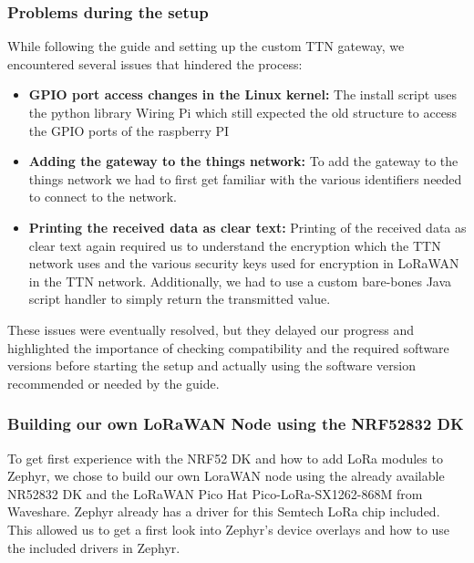 \subsubsection{Problems during the setup}
While following the guide and setting up the custom TTN gateway, we encountered several issues that hindered the process:
\begin{itemize}
    \item \textbf{GPIO port access changes in the Linux kernel:} The install script uses the python library Wiring Pi which still expected the old structure to access the GPIO ports of the raspberry PI
    \item \textbf{Adding the gateway to the things network:} To add the gateway to the things network we had to first get familiar with the various identifiers needed to connect to the network.
    \item \textbf{Printing the received data as clear text:} Printing of the received data as clear text again required us to understand the encryption which the TTN network uses and the various security keys used for encryption in LoRaWAN in the TTN network. Additionally, we had to use a custom bare-bones Java script handler to simply return the transmitted value.  
\end{itemize}
These issues were eventually resolved, but they delayed our progress and highlighted the importance of checking compatibility and the required software versions before starting the setup and actually using the software version recommended or needed by the guide.

\subsubsection{Building our own LoRaWAN Node using the NRF52832 DK}
To get first experience with the NRF52 DK and how to add LoRa modules to Zephyr, we chose to build our own LoraWAN node using the already available NR52832 DK and the LoRaWAN Pico Hat Pico-LoRa-SX1262-868M from Waveshare. Zephyr already has a driver for this Semtech LoRa chip included. This allowed us to get a first look into Zephyr's device overlays and how to use the included drivers in Zephyr.


